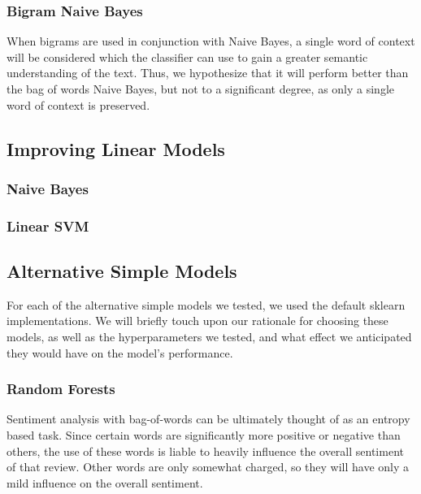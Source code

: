 \documentclass[conference]{IEEEtran}
\begin{document}
\subsubsection{Bigram Naive Bayes}

When bigrams are used in conjunction with Naive Bayes, a single word of context will be considered which the classifier can use to gain a greater semantic understanding of the text. Thus, we hypothesize that it will perform better than the bag of words Naive Bayes, but not to a significant degree, as only a single word of context is preserved.

\subsection{Improving Linear Models}


\subsubsection{Naive Bayes}


\subsubsection{Linear SVM}


\subsection{Alternative Simple Models}

For each of the alternative simple models we tested, we used the default sklearn implementations. We will briefly touch upon our rationale for choosing these models, as well as the hyperparameters we tested, and what effect we anticipated they would have on the model's performance.

\subsubsection{Random Forests}

Sentiment analysis with bag-of-words can be ultimately thought of as an entropy based task. Since certain words are significantly more positive or negative than others, the use of these words is liable to heavily influence the overall sentiment of that review. Other words are only somewhat charged, so they will have only a mild influence on the overall sentiment.
\end{document}

